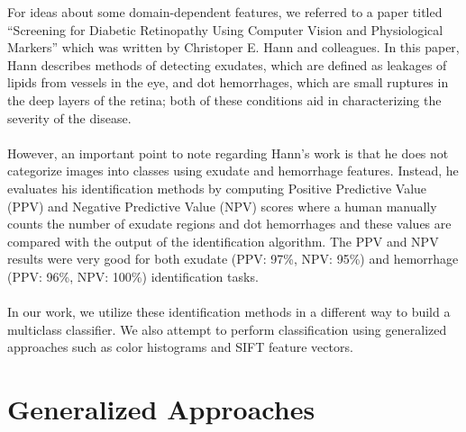 \documentclass{article} %
\begin{document}
\begin{figure}[H]
	\centering
\end{figure} 
For ideas about some domain-dependent features, we referred to a paper titled ``Screening for Diabetic Retinopathy Using Computer Vision and Physiological Markers'' \cite{hann2009} which was written by Christoper E. Hann and colleagues. In this paper, Hann describes methods of detecting exudates, which are defined as leakages of lipids from vessels in the eye, and dot hemorrhages, which are small ruptures in the deep layers of the retina; both of these conditions aid in characterizing the severity of the disease. \\ \\
However, an important point to note regarding Hann's work is that he does not categorize images into classes using exudate and hemorrhage features. Instead, he evaluates his identification methods by computing Positive Predictive Value (PPV) and Negative Predictive Value (NPV) scores where a human manually counts the number of exudate regions and dot hemorrhages and these values are compared with the output of the identification algorithm. The PPV and NPV results were very good for both exudate (PPV: 97\%, NPV: 95\%) and hemorrhage (PPV: 96\%, NPV: 100\%) identification tasks. \\ \\
In our work, we utilize these identification methods in a different way to build a multiclass classifier. We also attempt to perform classification using generalized approaches such as color histograms and SIFT feature vectors.

\section{Generalized Approaches}
\end{document}
